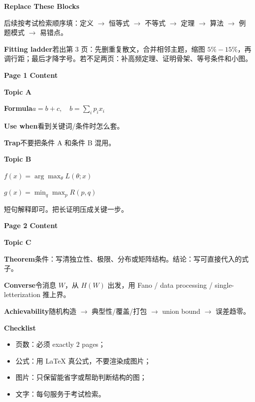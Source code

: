 \documentclass[UTF8,a4paper,landscape,fontset=none]{ctexart}
\newcommand{\chap}[1]{\par\textcolor{keyblue}{\sffamily\bfseries #1}\par}
\newcommand{\topic}[1]{\par\textcolor{keyblue}{\sffamily\bfseries #1}\par}
\newcommand{\fact}[2]{\par\textcolor{keyblue}{\sffamily\bfseries #1}\quad #2\par}
\newcommand{\twoline}[2]{\par\(\displaystyle #1\)\par[-1pt]\(\displaystyle #2\)\par}
\newcommand{\note}[2]{%
  \par\vspace{0.4pt}\noindent
  \begingroup
  \setlength{\fboxsep}{1.2pt}%
  \colorbox{lightbox}{%
    \begin{minipage}{0.965\linewidth}
    \textcolor{keyblue}{\sffamily\bfseries #1}\quad #2
    \end{minipage}}%
  \endgroup
  \par\vspace{0.4pt}%
}
\begin{document}
\begin{multicols*}{4}
\topic{Replace These Blocks}
后续按考试检索顺序填：定义 \(\to\) 恒等式 \(\to\) 不等式 \(\to\) 定理 \(\to\) 算法 \(\to\) 例题模式 \(\to\) 易错点。

\note{Fitting ladder}{若出第 3 页：先删重复散文，合并相邻主题，缩图 \(5\%-15\%\)，再调行距；最后才降字号。若不足两页：补高频定理、证明骨架、等号条件和小图。}


\chap{Page 1 Content}
\topic{Topic A}
\fact{Formula}{\(a=b+c,\quad b=\sum_i p_i x_i\)}
\fact{Use when}{看到关键词/条件时怎么套。}
\fact{Trap}{不要把条件 A 和条件 B 混用。}

\topic{Topic B}
\twoline{f(x)=\arg\max_{\theta} L(\theta;x)}
{g(x)=\min_q \max_p R(p,q)}
短句解释即可。把长证明压成关键一步。

\newpage

\chap{Page 2 Content}
\topic{Topic C}
\fact{Theorem}{条件：写清独立性、极限、分布或矩阵结构。结论：写可直接代入的式子。}
\note{Converse}{令消息 \(W\)，从 \(H(W)\) 出发，用 Fano / data processing / single-letterization 推上界。}
\note{Achievability}{随机构造 \(\to\) 典型性/覆盖/打包 \(\to\) union bound \(\to\) 误差趋零。}

\topic{Checklist}
\begin{itemize}
  \item 页数：必须 exactly \(2\) pages；
  \item 公式：用 LaTeX 真公式，不要渲染成图片；
  \item 图片：只保留能省字或帮助判断结构的图；
  \item 文字：每句服务于考试检索。
\end{itemize}

\end{multicols*}
\end{document}
